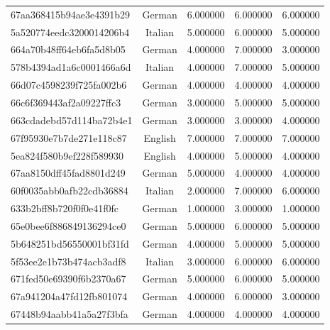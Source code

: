 \begin{table}[htbp]
\begin{tabular}{lcccc}
67aa368415b94ae3e4391b29 & German & 6.000000 & 6.000000 & 6.000000 \\
5a520774eedc3200014206b4 & Italian & 5.000000 & 6.000000 & 5.000000 \\
664a70b48ff64eb6fa5d8b05 & German & 4.000000 & 7.000000 & 3.000000 \\
578b4394ad1a6c0001466a6d & Italian & 4.000000 & 7.000000 & 5.000000 \\
66d07c4598239f725fa002b6 & German & 4.000000 & 4.000000 & 4.000000 \\
66c6f369443af2a09227ffc3 & German & 3.000000 & 5.000000 & 5.000000 \\
663cdadebd57d114ba72b4e1 & German & 3.000000 & 3.000000 & 4.000000 \\
67f95930e7b7de271e118c87 & English & 7.000000 & 7.000000 & 7.000000 \\
5ea824f580b9ef228f589930 & English & 4.000000 & 5.000000 & 4.000000 \\
67aa8150dff45fad8801d249 & German & 5.000000 & 4.000000 & 4.000000 \\
60f0035abb0afb22cdb36884 & Italian & 2.000000 & 7.000000 & 6.000000 \\
633b2bff8b720f0f0e41f0fc & German & 1.000000 & 3.000000 & 1.000000 \\
65e0bee6f886849136294ce0 & German & 5.000000 & 6.000000 & 5.000000 \\
5b648251bd56550001bf31fd & German & 4.000000 & 5.000000 & 5.000000 \\
5f53ee2e1b73b474acb3adf8 & Italian & 3.000000 & 6.000000 & 6.000000 \\
671fed50e69390f6b2370a67 & German & 5.000000 & 6.000000 & 5.000000 \\
67a941204a47fd12fb801074 & German & 4.000000 & 6.000000 & 3.000000 \\
67448b94aabb41a5a27f3bfa & German & 4.000000 & 4.000000 & 4.000000 \\
\bottomrule
\end{tabular}
\end{table}
